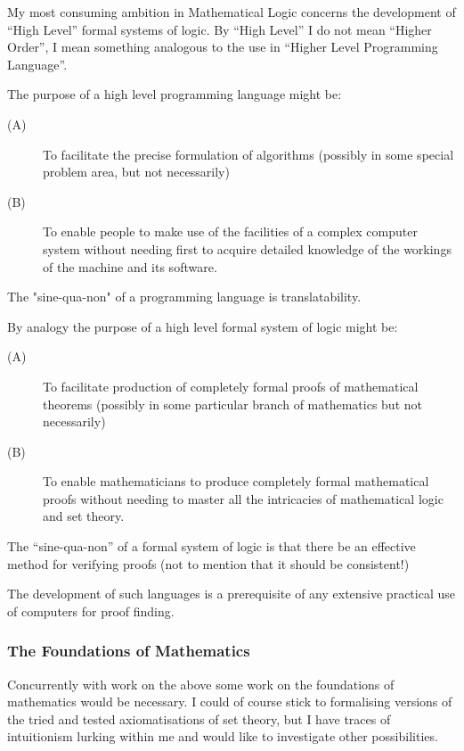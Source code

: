 \documentclass[10pt,titlepage]{book}
\begin{document}
My most consuming ambition in Mathematical Logic concerns the development of ``High Level'' formal systems of logic. By ``High Level'' I do not mean ``Higher Order'', I mean something analogous to the use in ``Higher Level Programming Language''.

The purpose of a high level programming language might be:

\begin{description}
\item[(A)]	To facilitate the precise formulation of algorithms (possibly in some special problem area, but not necessarily)
\item[(B)]	To enable people to make use of the facilities of a complex computer system without needing first to acquire detailed knowledge of the workings of the machine and its software.
\end{description}

The "sine-qua-non" of a programming language is translatability.

By analogy the purpose of a high level formal system of logic might be:
\begin{description}
\item[(A)]	To facilitate production of completely formal proofs of mathematical theorems (possibly in some particular branch of mathematics but not necessarily)
\item[(B)]	To enable mathematicians to produce completely formal mathematical proofs without needing to master all the intricacies of mathematical logic and set theory.
\end{description}

The ``sine-qua-non'' of a formal system of logic is that there be an effective method for verifying proofs (not to mention that it should be consistent!)

The development of such languages is a prerequisite of any extensive practical use of computers for proof finding.

\subsubsection{The Foundations of Mathematics}

Concurrently with work on the above some work on the foundations of mathematics would be necessary.
I could of course stick to formalising versions of the tried and tested axiomatisations of set theory, but I have traces of intuitionism lurking within me and would like to investigate other possibilities.
\end{document}
